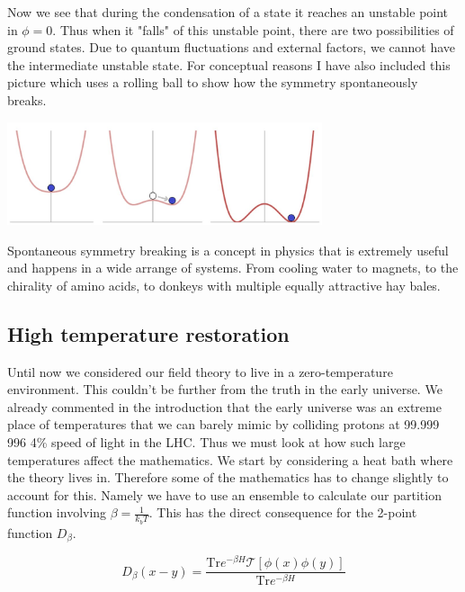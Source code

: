 \documentclass{article}
\numberwithin{equation}{section}
\begin{document}
Now we see that during the condensation of a state it reaches an unstable point in $\phi=0$.
Thus when it "falls" of this unstable point, there are two possibilities of ground states.
Due to quantum fluctuations and external factors, we cannot have the intermediate unstable state.
For conceptual reasons I have also included this picture which uses a rolling ball to show how the symmetry spontaneously breaks.

\begin{center}
\includegraphics[width=350px]{Knipsel3.PNG}    
\end{center}


Spontaneous symmetry breaking is a concept in physics that is extremely useful and happens in a wide arrange of systems.
From cooling water to magnets, to the chirality of amino acids, to donkeys with multiple equally attractive hay bales.





\subsection{High temperature restoration}

Until now we considered our field theory to live in a zero-temperature environment.
This couldn't be further from the truth in the early universe.
We already commented in the introduction that the early universe was an extreme place of temperatures that we can barely mimic by colliding protons at 99.999 996 4\% speed of light in the LHC.
Thus we must look at how such large temperatures affect the mathematics.
We start by considering a heat bath where the theory lives in.
Therefore some of the mathematics has to change slightly to account for this.
Namely we have to use an ensemble to calculate our partition function involving $\beta=\frac{1}{k_bT}$.
This has the direct consequence for the 2-point function $D_\beta$.

$$D_\beta (x-y)=\frac{\text{Tr} e^{-\beta H}\mathcal{T}[\phi(x)\phi(y)]}{\text{Tr} e^{-\beta H}}$$
\end{document}
